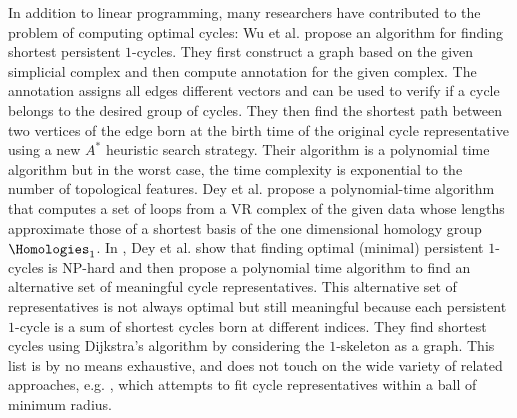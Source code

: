 In addition to linear programming, many researchers have contributed to the problem of computing optimal cycles: Wu et al. \cite{wu} propose an algorithm for finding shortest persistent $1$-cycles. They first construct a graph based on the given simplicial complex and then compute annotation for the given complex. The annotation assigns all edges different vectors and can be used to verify if a cycle belongs to the desired group of cycles. They then find the shortest path between two vertices of the edge born at the birth time of the original cycle representative using a new $A^*$ heuristic search strategy. Their algorithm is a polynomial time algorithm but in the worst case, the time complexity is exponential to the number of topological features. Dey et al. \cite{shortestonedimension} propose a polynomial-time algorithm that computes a set of loops from a VR complex of the given data whose lengths approximate those of a shortest basis of the one dimensional homology group $\Homologies_1$. In \cite{dey2018}, Dey et al. show that finding optimal (minimal) persistent $1$-cycles is NP-hard and then propose a polynomial time algorithm to find an alternative set of meaningful cycle representatives. This alternative set of representatives is not always optimal but still meaningful because each persistent $1$-cycle is a sum of shortest cycles born at different indices. They find shortest cycles using Dijkstra's algorithm by considering the $1$-skeleton as a graph.   This list is by no means exhaustive, and does not touch on the wide variety of related approaches, e.g. \cite{chenhardness}, which attempts to fit cycle representatives within a ball of minimum radius.



 

